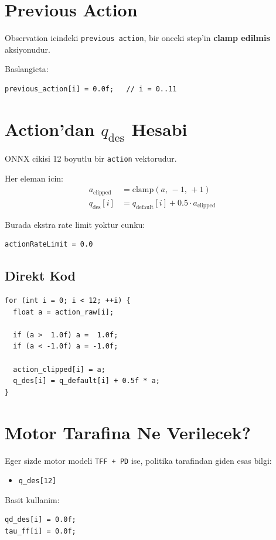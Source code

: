 \documentclass[11pt,a4paper]{article}
\begin{document}
\section{Previous Action}
Observation icindeki \texttt{previous action}, bir onceki step'in \textbf{clamp edilmis} aksiyonudur.

Baslangicta:
\begin{lstlisting}
previous_action[i] = 0.0f;   // i = 0..11
\end{lstlisting}

\section{Action'dan \(q_{\mathrm{des}}\) Hesabi}
ONNX cikisi 12 boyutlu bir \texttt{action} vektorudur.

Her eleman icin:
\begin{align*}
a_{\mathrm{clipped}} &= \mathrm{clamp}(a,\,-1,\,+1) \\
q_{\mathrm{des}}[i] &= q_{\mathrm{default}}[i] + 0.5 \cdot a_{\mathrm{clipped}}
\end{align*}

\noindent
Burada ekstra rate limit yoktur cunku:
\begin{lstlisting}
actionRateLimit = 0.0
\end{lstlisting}

\subsection*{Direkt Kod}
\begin{lstlisting}
for (int i = 0; i < 12; ++i) {
  float a = action_raw[i];

  if (a >  1.0f) a =  1.0f;
  if (a < -1.0f) a = -1.0f;

  action_clipped[i] = a;
  q_des[i] = q_default[i] + 0.5f * a;
}
\end{lstlisting}

\section{Motor Tarafina Ne Verilecek?}
Eger sizde motor modeli \texttt{TFF + PD} ise, politika tarafindan giden esas bilgi:
\begin{itemize}
  \item \texttt{q\_des[12]}
\end{itemize}

\noindent
Basit kullanim:
\begin{lstlisting}
qd_des[i] = 0.0f;
tau_ff[i] = 0.0f;
\end{lstlisting}
\end{document}
